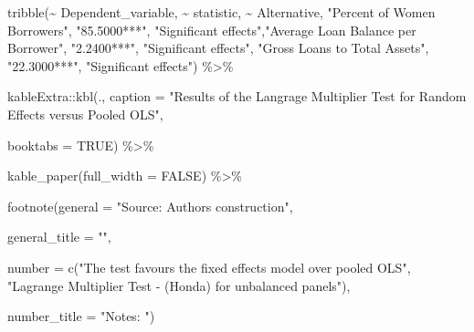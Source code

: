 \documentclass[a4paper,nobind]{templates/ociamthesis}
\newenvironment{Shaded}{\begin{snugshade}}{\end{snugshade}}
\newcommand{\AttributeTok}[1]{\textcolor[rgb]{0.77,0.63,0.00}{#1}}
\newcommand{\ConstantTok}[1]{\textcolor[rgb]{0.00,0.00,0.00}{#1}}
\newcommand{\FunctionTok}[1]{\textcolor[rgb]{0.00,0.00,0.00}{#1}}
\newcommand{\NormalTok}[1]{#1}
\newcommand{\SpecialCharTok}[1]{\textcolor[rgb]{0.00,0.00,0.00}{#1}}
\newcommand{\StringTok}[1]{\textcolor[rgb]{0.31,0.60,0.02}{#1}}
\renewenvironment{Shaded}
{
  \vspace{10pt}%
  \begin{snugshade}%
}{%
  \end{snugshade}%
  \vspace{8pt}%
}
\begin{document}
\begin{Shaded}
\begin{Highlighting}[]
\FunctionTok{tribble}\NormalTok{(}\SpecialCharTok{\textasciitilde{}}\NormalTok{ Dependent\_variable, }\SpecialCharTok{\textasciitilde{}}\NormalTok{ statistic, }\SpecialCharTok{\textasciitilde{}}\NormalTok{ Alternative,}
        \StringTok{"Percent of Women Borrowers"}\NormalTok{, }\StringTok{"85.5000***"}\NormalTok{, }\StringTok{"Significant effects"}\NormalTok{,}\StringTok{"Average Loan Balance per Borrower"}\NormalTok{, }\StringTok{"2.2400***"}\NormalTok{, }\StringTok{"Significant effects"}\NormalTok{, }\StringTok{"Gross Loans to Total Assets"}\NormalTok{, }\StringTok{"22.3000***"}\NormalTok{, }\StringTok{"Significant effects"}\NormalTok{) }\SpecialCharTok{\%\textgreater{}\%} 

\NormalTok{kableExtra}\SpecialCharTok{::}\FunctionTok{kbl}\NormalTok{(., }\AttributeTok{caption =} \StringTok{"Results of the Langrage Multiplier Test for Random Effects versus Pooled OLS"}\NormalTok{, }
      
  \AttributeTok{booktabs =} \ConstantTok{TRUE}\NormalTok{) }\SpecialCharTok{\%\textgreater{}\%} 
  
  \FunctionTok{kable\_paper}\NormalTok{(}\AttributeTok{full\_width =} \ConstantTok{FALSE}\NormalTok{) }\SpecialCharTok{\%\textgreater{}\%} 
  
  \FunctionTok{footnote}\NormalTok{(}\AttributeTok{general =} \StringTok{"Source: Authors\textquotesingle{} construction"}\NormalTok{,}
           
  \AttributeTok{general\_title =} \StringTok{""}\NormalTok{,}
  
  \AttributeTok{number =} \FunctionTok{c}\NormalTok{(}\StringTok{"The test favours the fixed effects model over pooled OLS"}\NormalTok{, }\StringTok{"Lagrange Multiplier Test {-} (Honda) for unbalanced panels"}\NormalTok{),}
  
  \AttributeTok{number\_title =} \StringTok{"Notes: "}\NormalTok{) }
\end{Highlighting}
\end{Shaded}
\end{document}

